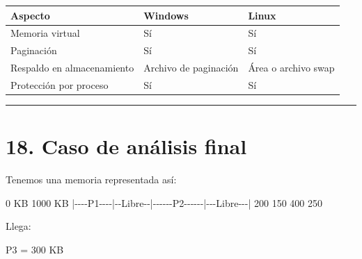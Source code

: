 \documentclass[
  spanish,
  letterpaper,
]{scrbook}
\newenvironment{Shaded}{\begin{snugshade}}{\end{snugshade}}
\newcommand{\NormalTok}[1]{\textcolor[rgb]{0.00,0.23,0.31}{#1}}
\newcounter{none} %
\begin{document}
{\def\LTcaptype{none} %
\begin{longtable}[]{@{}
  >{\raggedright\arraybackslash}p{}
  >{\raggedright\arraybackslash}p{}
  >{\raggedright\arraybackslash}p{}@{}}
\toprule\noalign{}
\begin{minipage}[b]{\linewidth}\raggedright
Aspecto
\end{minipage} & \begin{minipage}[b]{\linewidth}\raggedright
Windows
\end{minipage} & \begin{minipage}[b]{\linewidth}\raggedright
Linux
\end{minipage} \\
\midrule\noalign{}
\endhead
\bottomrule\noalign{}
\endlastfoot
Memoria virtual & Sí & Sí \\
Paginación & Sí & Sí \\
Respaldo en almacenamiento & Archivo de paginación & Área o archivo
swap \\
Protección por proceso & Sí & Sí \\
\end{longtable}
}

\begin{center}\rule{0.5\linewidth}{0.5pt}\end{center}


\chapter{18. Caso de análisis final}\label{caso-de-anuxe1lisis-final}

Tenemos una memoria representada así:

\begin{Shaded}
\begin{Highlighting}[]
\NormalTok{0 KB                                          1000 KB}
\NormalTok{|{-}{-}{-}{-}P1{-}{-}{-}{-}|{-}{-}Libre{-}{-}|{-}{-}{-}{-}{-}{-}P2{-}{-}{-}{-}{-}{-}|{-}{-}{-}Libre{-}{-}{-}|}
\NormalTok{    200       150          400          250}
\end{Highlighting}
\end{Shaded}

Llega:

\begin{Shaded}
\begin{Highlighting}[]
\NormalTok{P3 = 300 KB}
\end{Highlighting}
\end{Shaded}
\end{document}
